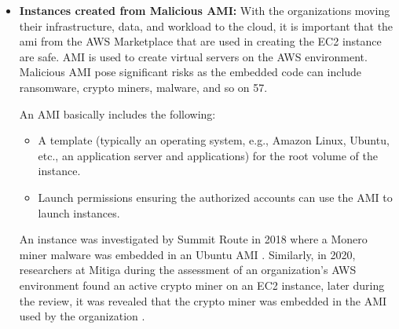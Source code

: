 \begin{itemize}
    \item \textbf{Instances created from Malicious AMI:} With the organizations moving their infrastructure, data,
    and workload to the cloud, it is important that the
    \gls{ami}
    from the AWS Marketplace that are
    used in creating the EC2 instance are safe. AMI is used to create virtual servers on the AWS environment.
    Malicious AMI pose significant risks as the embedded code can include ransomware, crypto miners, malware, and so
    on {57}.

    An AMI basically includes the following:
    \begin{itemize}
        \item A template (typically an operating system, e.g., Amazon Linux, Ubuntu, etc., an application server and applications) for the root volume of the instance.
    \end{itemize}
    \begin{itemize}
        \item Launch permissions ensuring the authorized accounts can use the AMI to launch instances.
    \end{itemize}
    An instance was investigated by Summit Route in 2018
    where a Monero miner malware was embedded in an
    Ubuntu AMI \cite{57}.
    Similarly, in 2020, researchers at Mitiga during the assessment of an organization’s AWS environment found an
    active crypto miner on an EC2 instance, later during the review, it was revealed that the crypto miner was
    embedded in the AMI used by the organization \cite{58}.
\end{itemize}

